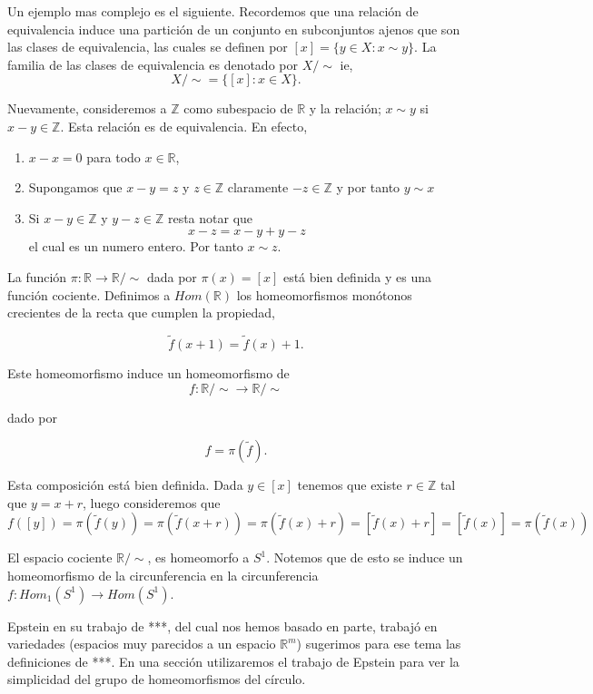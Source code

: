 Un ejemplo mas complejo es el siguiente. Recordemos que una relación de equivalencia induce una partición de un conjunto en subconjuntos ajenos que son las clases de equivalencia, las cuales se definen por $[x]=\{y \in X : x \sim y\}$. La familia de las clases de equivalencia es denotado por $X/ \sim$ ie, $$X/ \sim=\{[x]: x \in X\}.$$  

\begin{ej}\label{ej:Cir_un_coc}
Nuevamente, consideremos a $\mathbb{Z}$ como subespacio de $\mathbb{R}$ y la relación; $x \sim y$ si $x-y \in \mathbb{Z}$. Esta relación es de equivalencia. En efecto, 

	\begin{enumerate}
	\item $x-x=0 $ para todo $x \in \mathbb{R}$,
	\item Supongamos que $x-y=z$ y $z \in \mathbb{Z}$ claramente $-z \in \mathbb{Z}$ y por tanto $y \sim x$
	\item Si $x-y \in \mathbb{Z}$ y $y-z \in \mathbb{Z}$ resta notar que $$x-z=x-y+y-z$$
el cual es un numero entero. Por tanto $x \sim z$.  
	\end{enumerate}

La función  $\pi: \mathbb{R} \to \mathbb{R}/ \sim$ dada por
$\pi (x)=[x]$ está bien definida y es una función cociente. Definimos a $Hom(\mathbb{R})$ los homeomorfismos monótonos crecientes de la recta que cumplen la propiedad, 

$$\tilde{f}(x+1)= \tilde{f}(x)+1.$$

Este homeomorfismo induce un homeomorfismo de 
$$f:\mathbb{R}/ \sim \to  \mathbb{R}/ \sim$$

dado por 
 
$$f=\pi(\tilde{f}).$$

 Esta composición está bien definida. Dada $y \in [x]$ tenemos que existe $r \in \mathbb{Z}$ tal que $y=x+r$, luego consideremos que 
 $$f([y])=\pi(\tilde{f}(y))=\pi(\tilde{f}(x+r))=\pi(\tilde{f}(x)+r)=[\tilde{f}(x)+r]=[\tilde{f}(x)]=\pi(\tilde{f}(x))$$


El espacio cociente $\mathbb{R}/ \sim$, es  homeomorfo a $S^1$. Notemos que de esto se induce un homeomorfismo de la circunferencia en la circunferencia $f:Hom_1(S^1) \to Hom(S^1)$.
\end{ej}


Epstein en su trabajo de ***, del cual nos hemos basado en parte, trabajó en variedades (espacios muy parecidos a un espacio $\mathbb{R}^m$) sugerimos para ese tema las definiciones de ***. En una sección utilizaremos el trabajo de Epstein para ver la simplicidad del grupo de homeomorfismos del círculo.



 
